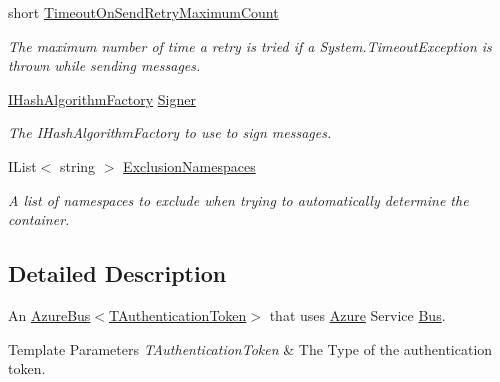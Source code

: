 \begin{DoxyCompactItemize}
short \hyperlink{classCqrs_1_1Azure_1_1ServiceBus_1_1AzureServiceBus_a4cc1f3523c56c534ff72c7da0e718482_a4cc1f3523c56c534ff72c7da0e718482}{Timeout\+On\+Send\+Retry\+Maximum\+Count}
\begin{DoxyCompactList}\small\item\em The maximum number of time a retry is tried if a System.\+Timeout\+Exception is thrown while sending messages. \end{DoxyCompactList}\item 
\hyperlink{interfaceCqrs_1_1Bus_1_1IHashAlgorithmFactory}{I\+Hash\+Algorithm\+Factory} \hyperlink{classCqrs_1_1Azure_1_1ServiceBus_1_1AzureServiceBus_aef1f30f0a2a1a4fcbab9a780bec4a185_aef1f30f0a2a1a4fcbab9a780bec4a185}{Signer}
\begin{DoxyCompactList}\small\item\em The I\+Hash\+Algorithm\+Factory to use to sign messages. \end{DoxyCompactList}\item 
I\+List$<$ string $>$ \hyperlink{classCqrs_1_1Azure_1_1ServiceBus_1_1AzureServiceBus_a1b1fe260b6437442543b15048f47abc6_a1b1fe260b6437442543b15048f47abc6}{Exclusion\+Namespaces}
\begin{DoxyCompactList}\small\item\em A list of namespaces to exclude when trying to automatically determine the container. \end{DoxyCompactList}\end{DoxyCompactItemize}


\subsection{Detailed Description}
An \hyperlink{classCqrs_1_1Azure_1_1ServiceBus_1_1AzureBus_a1046ff74282fd178f43e28420433d2a9_a1046ff74282fd178f43e28420433d2a9}{Azure\+Bus$<$\+T\+Authentication\+Token$>$} that uses \hyperlink{namespaceCqrs_1_1Azure}{Azure} Service \hyperlink{namespaceCqrs_1_1Bus}{Bus}. 


\begin{DoxyTemplParams}{Template Parameters}
{\em T\+Authentication\+Token} & The Type of the authentication token.\\
\hline
\end{DoxyTemplParams}


